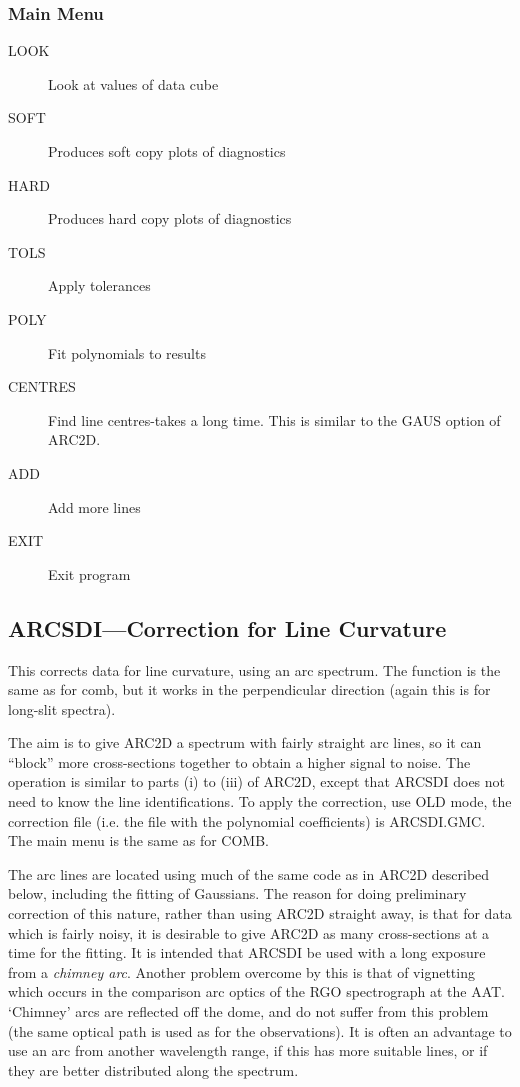 \subsubsection{Main Menu}

\begin{description}
\item[LOOK] Look at values of data cube
\item[SOFT] Produces soft copy plots of diagnostics
\item[HARD] Produces hard copy plots of diagnostics
\item[TOLS] Apply tolerances
\item[POLY] Fit polynomials to results
\item[CENTRES] Find line centres-takes a long time.
This is similar to the GAUS option of ARC2D.
\item[ADD] Add more lines
\item[EXIT] Exit program
\end{description}

\subsection{ARCSDI---Correction for Line Curvature}

This corrects data for line curvature, using an arc spectrum.
The function is the same as for comb, but it works in the perpendicular
direction (again this is for long-slit spectra).

The aim is to give ARC2D a spectrum with fairly straight arc lines, so
it can ``block'' more cross-sections together to obtain a higher signal
to noise.
The operation is similar to parts (i) to (iii) of ARC2D, except that
ARCSDI does not need to know the line identifications.
To apply the correction, use OLD mode, the correction file (i.e. the
file with the polynomial coefficients) is ARCSDI.GMC.
The main menu is the same as for COMB.

The arc lines are located using much of the same code as in ARC2D
described below, including the fitting of Gaussians. The reason for
doing preliminary correction of this nature, rather than using ARC2D
straight away, is that for data which is fairly noisy, it is desirable
to give ARC2D as many cross-sections at a time for the fitting. It is
intended that ARCSDI be used with a long exposure from a {\em chimney
arc}. Another problem overcome by this is that of vignetting which
occurs in the comparison arc optics of the RGO spectrograph at the
AAT\@. `Chimney' arcs are reflected off the dome, and do not suffer
from this problem (the same optical path is used as for the
observations). It is often an advantage to use an arc from another
wavelength range, if this has more suitable lines, or if they are
better distributed along the spectrum.

